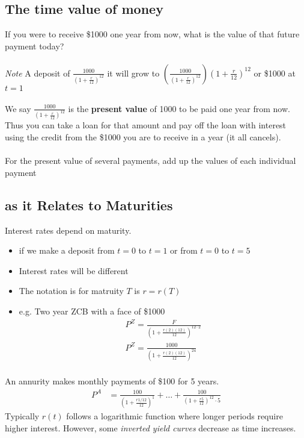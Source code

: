 \documentclass[12pt,letterpaper, twocolumn]{article}
\begin{document}
\subsection{The time value of money}
If you were to receive \$1000 one year from now, what is the value of that future payment today? 
\\\\
\textit{Note} A deposit of $\frac{1000}{(1+\frac{r}{12})^{12}}$ it will grow to $(\frac{1000}{(1+\frac{r}{12})^{12}})(1+\frac{r}{12})^{12}$ or \$1000 at $t=1$
\\\\
We say $\frac{1000}{(1+\frac{r}{12})^{12}}$ is the \textbf{present value} of 1000 to be paid one year from now. Thus you can take a loan for that amount and pay off the loan with interest using the credit from the \$1000 you are to receive in a year (it all cancels). 
\\\\
For the present value of several payments,  add up the values of each individual payment

\subsection{as it Relates to Maturities}
Interest rates depend on maturity. 
\begin{itemize}
    \item if we make a deposit from $t=0$ to $t=1$ or from $t=0$ to $t=5$
    \item Interest rates will be different
    \item The notation is for matruity $T$ is $r=r(T)$
    \item e.g. Two year ZCB with a face of \$1000
    \begin{align*}
        P^{Z} = \frac{F}{(1+\frac{r(2)(12)}{12})^{12\cdot2}}\\
        P^{Z} = \frac{1000}{(1+\frac{r(2)(12)}{12})^{24}}\\
    \end{align*}
\end{itemize}
An annurity makes monthly payments of \$100 for 5 years. 
\begin{align*}
    P^A&=\frac{100}{(1+\frac{r{1/12}}{12})^1} + \dots + \frac{100}{(1+\frac{r{5}}{12})^12\cdot5}
\end{align*}
Typically $r(t)$ follows a logarithmic function where longer periods require higher interest. However, some \textit{inverted yield curves} decrease as time increases. 
\end{document}
